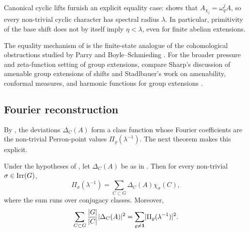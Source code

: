 \begin{remark}
  Canonical cyclic lifts furnish an explicit equality case:
   shows that
  \(A_{\chi_j}=\omega_q^jA\), so every non-trivial cyclic character has
  spectral radius \(\lambda\). In particular, primitivity of the base
  shift does not by itself imply \(\eta<\lambda\), even for finite
  abelian extensions.
\end{remark}

\begin{remark}
  The equality mechanism of
  is the finite-state analogue of the cohomological obstructions studied by Parry
  \cite{Parry1999LivsicNonAbelian} and Boyle--Schmieding
  \cite{BoyleSchmieding2017FiniteGroupExtensions}. For the broader
  pressure and zeta-function setting of group extensions, compare
  Sharp's discussion of amenable group extensions of shifts
  \cite{Sharp2020AmenableGroupExtensions} and Stadlbauer's work on
  amenability, conformal measures, and harmonic functions for group
  extensions
  \cite{Stadlbauer2013KestenAmenability,Stadlbauer2019ConformalMeasures}.
\end{remark}

\subsection{Fourier reconstruction}

By , the deviations
\(\Delta_C(A)\) form a class function whose Fourier coefficients are the
non-trivial Perron-point values \(\Pi_\varrho(\lambda^{-1})\). The next
theorem makes this explicit.

\begin{theorem}
  \label{thm:class-mertens-fourier}
  Under the hypotheses of , let
  \(\Delta_C(A)\) be as in . Then
  for every non-trivial \(\sigma\in\operatorname{Irr}(G)\),
  \begin{equation}\label{eq:class-mertens-fourier-inversion}
    \Pi_\sigma(\lambda^{-1})
    =
    \sum_{C\subset G}\Delta_C(A)\chi_\sigma(C),
  \end{equation}
  where the sum runs over conjugacy classes. Moreover,
  \begin{equation}\label{eq:class-mertens-plancherel}
    \sum_{C\subset G}\frac{|G|}{|C|}\lvert \Delta_C(A) \rvert^2
    =
    \sum_{\varrho\neq\mathbf 1}
      \lvert \Pi_\varrho(\lambda^{-1}) \rvert^2.
  \end{equation}
\end{theorem}

